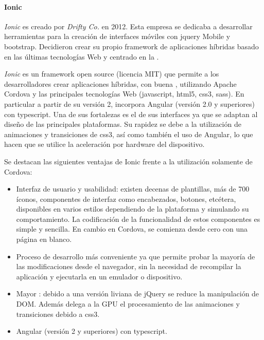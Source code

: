 \paragraph{Ionic}
\label{ionic}

\textit{Ionic} es creado por \textit{Drifty Co.} en 2012. Esta empresa se dedicaba a desarrollar herramientas para la creación de interfaces móviles con \gls{jquery} Mobile y \gls{bootstrap}. Decidieron crear su propio \gls{framework} de aplicaciones híbridas basado en las últimas tecnologías Web y centrado en la .

\textit{Ionic} es un \gls{framework} \gls{open source} (licencia MIT) que permite a los desarrolladores crear aplicaciones híbridas, con buena , utilizando Apache Cordova y las principales tecnologías Web (\gls{javascript}, \gls{html}5, \gls{css}3, sass). En particular a partir de su versión 2, incorpora Angular (versión 2.0 y superiores) con \gls{typescript}. Una de sus fortalezas es el  de sus interfaces ya que se adaptan al diseño de las principales plataformas\cite{ionic2017concepts}. Su rapidez se debe a la utilización de animaciones y transiciones de \gls{css}3, así como también el uso de Angular, lo que hacen que se utilice la aceleración por hardware del dispositivo\cite{hartington2017animationsIonic}.

Se destacan las siguientes ventajas de Ionic frente a la utilización solamente de Cordova\cite{noupe2016ionicvscordova}:
\begin{itemize}
\item Interfaz de usuario y usabilidad: existen decenas de plantillas, más de 700 íconos, componentes de interfaz como encabezados, botones, etcétera, disponibles en varios estilos dependiendo de la plataforma y simulando su comportamiento. La codificación de la funcionalidad de estos componentes es simple y sencilla. En cambio en Cordova, se comienza desde cero con una página en blanco.
\item Proceso de desarrollo más conveniente ya que permite probar la mayoría de las modificaciones  desde el navegador, sin la necesidad de recompilar la aplicación y ejecutarla en un emulador o dispositivo.
\item Mayor : debido a una versión liviana de jQuery se reduce la manipulación de DOM. Además delega a la GPU el procesamiento de las animaciones y transiciones debido a \gls{css}3.
\item Angular (versión 2 y superiores) con \gls{typescript}.
\end{itemize}

